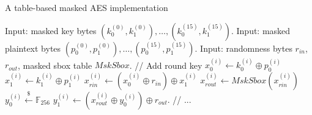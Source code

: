 \documentclass[aspectratio=169]{beamer}
\begin{document}
\begin{frame}{A table-based masked AES implementation}
    \begin{algorithmic}
        \ttfamily
        \State Input: masked key bytes $(k^{(0)}_0, k^{(0)}_1),\dots, (k^{(15)}_0, k^{(15)}_1)$.
        \State Input: masked plaintext bytes $(p^{(0)}_0, p^{(0)}_1),\dots, (p^{(15)}_0, p^{(15)}_1)$.
        \State Input: randomness bytes $r_{in}$, $r_{out}$, masked sbox table $MskSbox$.
        \State // Add round key
            \State $x^{(i)}_0 \gets k^{(i)}_0 \oplus p^{(i)}_0$
            \State $x^{(i)}_1 \gets k^{(i)}_1 \oplus p^{(i)}_1$
            \State $x^{(i)}_{rin} \gets (x^{(i)}_0 \oplus r_{in}) \oplus x^{(i)}_1$
            \State $x^{(i)}_{rout} \gets MskSbox(x^{(i)}_{rin})$
            \State $y^{(i)}_0 \xleftarrow{\$} \mathbb{F}_{256}$
            \State $y^{(i)}_1 \gets (x^{(i)}_{rout} \oplus y^{(i)}_0) \oplus r_{out}$.
        \EndFor
        \State // ...
    \end{algorithmic}
\end{frame}
\end{document}

